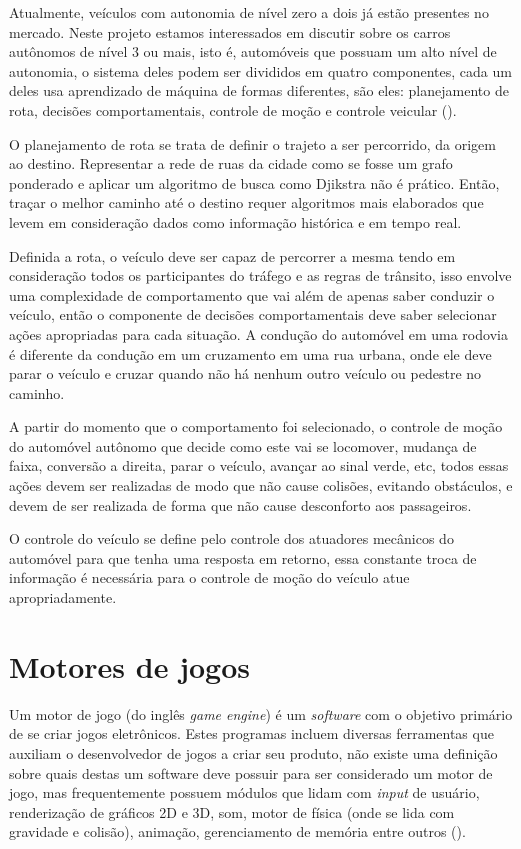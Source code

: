 Atualmente, veículos com autonomia de nível zero a dois já estão presentes no mercado. Neste projeto estamos interessados em discutir sobre os carros autônomos de nível 3 ou mais, isto é, automóveis que possuam um alto nível de autonomia, o sistema deles podem ser divididos em quatro componentes, cada um deles usa aprendizado de máquina de formas diferentes, são eles: planejamento de rota, decisões comportamentais, controle de moção e controle veicular (). 

O planejamento de rota se trata de definir o trajeto a ser percorrido, da origem ao destino. Representar a rede de ruas da cidade como se fosse um grafo ponderado e aplicar um algoritmo de busca como Djikstra não é prático. Então, traçar o melhor caminho até o destino requer algoritmos mais elaborados que levem em consideração dados como informação histórica e em tempo real.

Definida a rota, o veículo deve ser capaz de percorrer a mesma tendo em consideração todos os participantes do tráfego e as regras de trânsito, isso envolve uma complexidade de comportamento que vai além de apenas saber conduzir o veículo, então o componente de decisões comportamentais deve saber selecionar ações apropriadas para cada situação. A condução do automóvel em uma rodovia é diferente da condução em um cruzamento em uma rua urbana, onde ele deve parar o veículo e cruzar quando não há nenhum outro veículo ou pedestre no caminho.

A partir do momento que o comportamento foi selecionado, o controle de moção do automóvel autônomo que decide como este vai se locomover, mudança de faixa, conversão a direita, parar o veículo, avançar ao sinal verde, etc, todos essas ações devem ser realizadas de modo que não cause colisões, evitando obstáculos, e devem de ser realizada de forma que não cause desconforto aos passageiros.

O controle do veículo se define pelo controle dos atuadores mecânicos do automóvel para que tenha uma resposta em retorno, essa constante troca de informação é necessária para o controle de moção do veículo atue apropriadamente.

\section{Motores de jogos}
Um motor de jogo (do inglês \textit{game engine}) é um \textit{software} com o objetivo primário de se criar jogos eletrônicos. Estes programas incluem diversas ferramentas que auxiliam o desenvolvedor de jogos a criar seu produto, não existe uma definição sobre quais destas um software deve possuir para ser considerado um motor de jogo, mas frequentemente possuem módulos que lidam com \textit{input} de usuário, renderização de gráficos 2D e 3D, som, motor de física (onde se lida com gravidade e colisão), animação, gerenciamento de memória entre outros (). 

